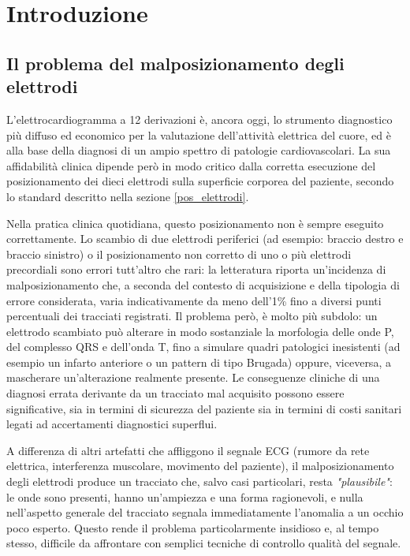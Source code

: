 \chapter*{Introduzione}

\section*{Il problema del malposizionamento degli elettrodi}

L'elettrocardiogramma a 12 derivazioni è, ancora oggi, lo strumento diagnostico più diffuso ed economico per la valutazione dell'attività elettrica del cuore, ed è alla base della diagnosi di un ampio spettro di patologie cardiovascolari. La sua affidabilità clinica dipende però in modo critico dalla corretta esecuzione del posizionamento dei dieci elettrodi sulla superficie corporea del paziente, secondo lo standard descritto nella sezione \ref{pos_elettrodi}.

Nella pratica clinica quotidiana, questo posizionamento non è sempre eseguito correttamente. Lo scambio di due elettrodi periferici (ad esempio: braccio destro e braccio sinistro) o il posizionamento non corretto di uno o più elettrodi precordiali sono errori tutt'altro che rari: la letteratura riporta un'incidenza di malposizionamento che, a seconda del contesto di acquisizione e della tipologia di errore considerata, varia indicativamente da meno dell'1\% fino a diversi punti percentuali dei tracciati registrati. Il problema però, è molto più subdolo: un elettrodo scambiato può alterare in modo sostanziale la morfologia delle onde P, del complesso QRS e dell'onda T, fino a simulare quadri patologici inesistenti (ad esempio un infarto anteriore o un pattern di tipo Brugada) oppure, viceversa, a mascherare un'alterazione realmente presente. Le conseguenze cliniche di una diagnosi errata derivante da un tracciato mal acquisito possono essere significative, sia in termini di sicurezza del paziente sia in termini di costi sanitari legati ad accertamenti diagnostici superflui.

A differenza di altri artefatti che affliggono il segnale ECG (rumore da rete elettrica, interferenza muscolare, movimento del paziente), il malposizionamento degli elettrodi produce un tracciato che, salvo casi particolari, resta \textit{"plausibile"}: le onde sono presenti, hanno un'ampiezza e una forma ragionevoli, e nulla nell'aspetto generale del tracciato segnala immediatamente l'anomalia a un occhio poco esperto. Questo rende il problema particolarmente insidioso e, al tempo stesso, difficile da affrontare con semplici tecniche di controllo qualità del segnale.

